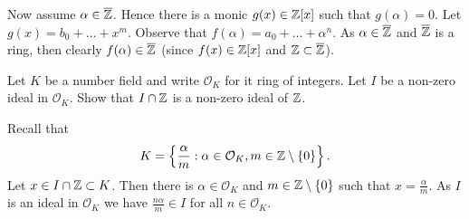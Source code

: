 \documentclass[a4paper, answers]{exam}
\begin{document}
\begin{questions}
\begin{solution}
		Now assume $\alpha \in \overline{\mathbb{Z}}$.
		Hence there is a monic $g(x) \in \mathbb{Z}[x]$ such that $g(\alpha) = 0$.
		Let $g(x) = b_0 + \ldots + x^m$.
		Observe that $f(\alpha) = a_0 + \ldots + \alpha^n$.
		As $\alpha \in \overline{\mathbb{Z}}$ and $\overline{\mathbb{Z}}$ is a ring,
		then clearly $f(\alpha) \in \overline{\mathbb{Z}}$
		(since $f(x) \in \mathbb{Z}[x]$ and $\mathbb{Z} \subset \overline{\mathbb{Z}}$).
	\end{solution}

	\question
	Let $K$ be a number field and write $\mathcal O_K$ for it
	ring of integers.
	Let $I$ be a non-zero ideal in $\mathcal O_K$.
	Show that $I \cap \mathbb{Z}$ is a non-zero ideal of $\mathbb{Z}$.
	\begin{solution}
		Recall that
		\[
			K = \left\{ \frac{\alpha}{m}:
				\alpha \in \mathcal O_K, m \in \mathbb{Z} \setminus \left\{ 0 \right\}
			\right\}.
		\]
		Let $x \in I \cap \mathbb{Z} \subset K$.
		Then there is $\alpha \in \mathcal O_K$ and 
		$m \in \mathbb{Z} \setminus \left\{ 0 \right\}$
		such that $x = \frac{\alpha}{m}$.
		As $I$ is an ideal in $\mathcal O_K$ we have
		$\frac{n\alpha}{m} \in I$ for all $n \in \mathcal O_K$.
	\end{solution}
\end{questions}
\end{document}
